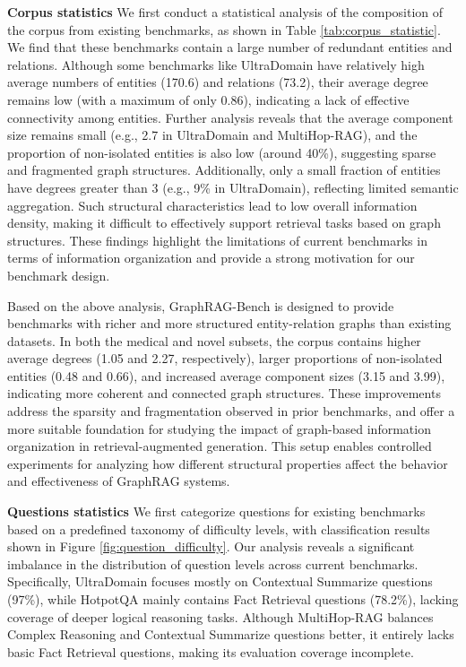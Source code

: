 \documentclass{article} %
\begin{document}
\textbf{Corpus statistics} We first conduct a statistical analysis of the composition of the corpus from existing benchmarks, as shown in Table \ref{tab:corpus_statistic}. We find that these benchmarks contain a large number of redundant entities and relations. Although some benchmarks like UltraDomain have relatively high average numbers of entities (170.6) and relations (73.2), their average degree remains low (with a maximum of only 0.86), indicating a lack of effective connectivity among entities. Further analysis reveals that the average component size remains small (e.g., 2.7 in UltraDomain and MultiHop-RAG), and the proportion of non-isolated entities is also low (around 40\%), suggesting sparse and fragmented graph structures. Additionally, only a small fraction of entities have degrees greater than 3 (e.g., 9\% in UltraDomain), reflecting limited semantic aggregation. Such structural characteristics lead to low overall information density, making it difficult to effectively support retrieval tasks based on graph structures. These findings highlight the limitations of current benchmarks in terms of information organization and provide a strong motivation for our benchmark design.

Based on the above analysis, GraphRAG-Bench is designed to provide benchmarks with richer and more structured entity-relation graphs than existing datasets. In both the medical and novel subsets, the corpus contains higher average degrees (1.05 and 2.27, respectively), larger proportions of non-isolated entities (0.48 and 0.66), and increased average component sizes (3.15 and 3.99), indicating more coherent and connected graph structures. These improvements address the sparsity and fragmentation observed in prior benchmarks, and offer a more suitable foundation for studying the impact of graph-based information organization in retrieval-augmented generation. This setup enables controlled experiments for analyzing how different structural properties affect the behavior and effectiveness of GraphRAG systems.

\textbf{Questions statistics} We first categorize questions for existing benchmarks based on a predefined taxonomy of difficulty levels, with classification results shown in Figure \ref{fig:question_difficulty}. Our analysis reveals a significant imbalance in the distribution of question levels across current benchmarks. Specifically, UltraDomain focuses mostly on Contextual Summarize questions (97\%), while HotpotQA mainly contains Fact Retrieval questions (78.2\%), lacking coverage of deeper logical reasoning tasks. Although MultiHop-RAG balances Complex Reasoning and Contextual Summarize questions better, it entirely lacks basic Fact Retrieval questions, making its evaluation coverage incomplete.
\end{document}
